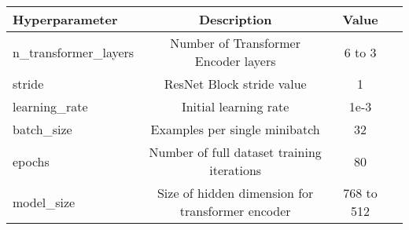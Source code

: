 {\small\begin{center}
\begin{tabular} { | l | c | c | c | }
\hline
Hyperparameter & Description & Value \\
\hline
n\_transformer\_layers & Number of Transformer Encoder layers & 6 to 3 \\
stride & ResNet Block stride value & 1 \\
learning\_rate & Initial learning rate & 1e-3 \\
batch\_size & Examples per single minibatch & 32 \\
epochs & Number of full dataset training iterations & 80 \\
model\_size & Size of hidden dimension for transformer encoder & 768 to 512 \\
\hline
\end{tabular}
\end{center}}